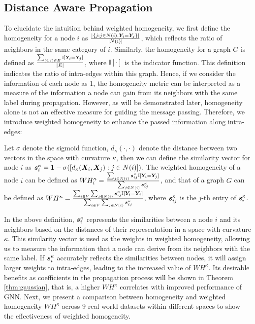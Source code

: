 \subsection{Distance Aware Propagation}
\label{subsec:DAP}

To elucidate the intuition behind weighted homogeneity, we first define the homogeneity for a node $i$ as $\frac{|\{j:j\in N(i), \boldsymbol{Y}_i=\boldsymbol{Y}_j\}|}{|N(i)|}$, which reflects the ratio of neighbors in the same category of $i$. Similarly, the homogeneity for a graph $G$ is defined as $\frac{\sum_{(i,j)\in E}\mathbb{I}[\boldsymbol{Y}_i=\boldsymbol{Y}_j]}{|E|}$, where $\mathbb{I}[\cdot]$ is the indicator function. This definition indicates the ratio of intra-edges within this graph. Hence, if we consider the information of each node as 1, the homogeneity metric can be interpreted as a measure of the information a node can gain from its neighbors with the same label during propagation. However, as will be demonstrated later, homogeneity alone is not an effective measure for guiding the message passing. Therefore, we introduce weighted homogeneity to enhance the passed information along intra-edges: 
\begin{definition}
\label{def:homo}
    Let $\sigma$ denote the sigmoid function, $d_\kappa(\cdot,\cdot)$ denote the distance between two vectors in the space with curvature $\kappa$, then we can define the similarity vector for node $i$ as $\boldsymbol{s}_i^\kappa=\boldsymbol{1}-\sigma([d_\kappa(\boldsymbol{X}_i, \boldsymbol{X}_j): j\in N(i)])$. The weighted homogeneity of a node $i$ can be defined as $WH^\kappa_i=\frac{\sum_{j\in N(i)}\boldsymbol{s}_{ij}^\kappa\mathbb{I}[\boldsymbol{Y}_i=\boldsymbol{Y}_j]}{\sum_{j\in N(i)}\boldsymbol{s}_{ij}^\kappa}$, and that of a graph $G$ can be defined as $WH^\kappa=\frac{\sum_{i\in V}\sum_{j\in N(i)}\boldsymbol{s}_{ij}^\kappa\mathbb{I}[\boldsymbol{Y}_i=\boldsymbol{Y}_j]}{\sum_{i\in V}\sum_{j\in N(i)}\boldsymbol{s}_{ij}^\kappa}$, {\update where $\boldsymbol{s}_{ij}^\kappa$ is the $j$-th entry of $\boldsymbol{s}_{i}^\kappa$}. 
\end{definition}



In the above definition, $\boldsymbol{s}_i^\kappa$ represents the similarities between a node $i$ and its neighbors based on the distances of their representation in a space with curvature $\kappa$. This similarity vector is used as the weights in weighted homogeneity, allowing us to measure the information that a node can derive from its neighbors with the same label. If $\boldsymbol{s}_i^\kappa$ accurately reflects the similarities between nodes, it will assign larger weights to intra-edges, leading to the increased value of $WH^\kappa$. Its desirable benefits as coefficients in the propagation process will be shown in Theorem \ref{thm:gaussian}, that is, a higher $WH^\kappa$ correlates with improved performance of GNN. Next, we present a comparison between homogeneity and weighted homogeneity $WH^\kappa$ across 9 real-world datasets within different spaces to show the effectiveness of weighted homogeneity. 

